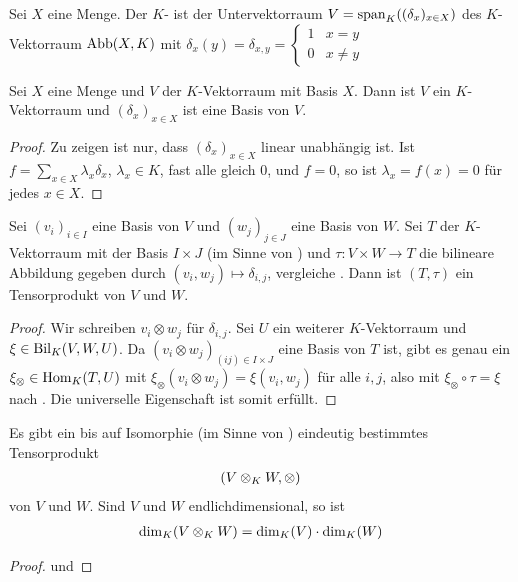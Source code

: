 \begin{definition}
	Sei $X$ eine Menge. Der $K$- ist der Untervektorraum $V=\operatorname{span}_K((\delta_x)_{x\in X})$ des $K$-Vektorraum $\operatorname{Abb}(X,K)$ mit $\delta_x(y)=\delta_{x,y}=\begin{cases}1&x=y\\0&x\neq y\end{cases}$
\end{definition}

\begin{lemma}
	Sei $X$ eine Menge und $V$ der $K$-Vektorraum mit Basis $X$. Dann ist $V$ ein $K$-Vektorraum und $(\delta_x)_{x\in X}$ ist eine Basis von $V$.
\end{lemma}
\begin{proof}
	Zu zeigen ist nur, dass $(\delta_x)_{x\in X}$ linear unabhängig ist. Ist $f=\sum_{x\in X}\lambda_x \delta_x$, $\lambda_x\in K$, fast alle gleich 0, und $f=0$, so ist $\lambda_x=f(x)=0$ für jedes $x\in X$. 
\end{proof}

\begin{lemma}
	Sei $(v_i)_{i\in I}$ eine Basis von $V$ und $(w_j)_{j\in J}$ eine Basis von $W$. Sei $T$ der $K$-Vektorraum mit der Basis $I\times J$ (im Sinne von ) und $\tau:V\times W\to T$ die bilineare Abbildung gegeben durch $(v_i,w_j)\mapsto \delta_{i,j}$, vergleiche . Dann ist $(T,\tau)$ ein Tensorprodukt von $V$ und $W$.
\end{lemma}
\begin{proof}
	Wir schreiben $v_i\otimes w_j$ für $\delta_{i,j}$. Sei $U$ ein weiterer $K$-Vektorraum und $\xi\in\operatorname{Bil}_K(V,W,U)$. Da $(v_i\otimes w_j)_{(ij)\in I\times J}$ eine Basis von $T$ ist, gibt es genau ein $\xi_\otimes\in\operatorname{Hom}_K(T,U)$ mit $\xi_\otimes(v_i\otimes w_j)=\xi(v_i,w_j)$ für alle $i,j$, also mit $\xi_\otimes\circ\tau=\xi$ nach . Die universelle Eigenschaft ist somit erfüllt.
\end{proof}

\begin{proposition}
	Es gibt ein bis auf Isomorphie (im Sinne von ) eindeutig bestimmtes Tensorprodukt
	\begin{align}
		(V\otimes_K W,\otimes)\notag
	\end{align}
	von $V$ und $W$. Sind $V$ und $W$ endlichdimensional, so ist
	\begin{align}
		\dim_K(V\otimes_K W)=\dim_K(V)\cdot\dim_K(W)\notag
	\end{align}
\end{proposition}
\begin{proof}
	 und 
\end{proof}

